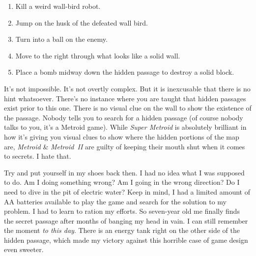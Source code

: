 \documentclass{book}
\let\oldcenter\center
\let\oldendcenter\endcenter
\renewenvironment{center}{\setlength\topsep{0pt}\oldcenter}{\oldendcenter}
\begin{document}
\begin{enumerate}
\item Kill a weird wall-bird robot.
\item Jump on the husk of the defeated wall bird.
\item Turn into a ball on the enemy.
\item Move to the right through what looks like a solid wall.
\item Place a bomb midway down the hidden passage to destroy a solid block.
\end{enumerate}\noindent

\begin{center}
\quad\vspace{4pt}
\quad\vspace{4pt}
\quad\vspace{4pt}
\quad\vspace{4pt}
\quad\vspace{4pt}
\quad\vspace{4pt}
\end{center}

It’s not impossible. It’s not overtly complex. But it is inexcusable that there is no hint whatsoever. There’s no instance where you are taught that hidden passages exist prior to this one. There is no visual clue on the wall to show the existence of the passage. Nobody tells you to search for a hidden passage (of course nobody talks to you, it’s a Metroid game). While \emph{Super Metroid} is absolutely brilliant in how it’s giving you visual clues to show where the hidden portions of the map are, \emph{Metroid} \& \emph{Metroid~II} are guilty of keeping their mouth shut when it comes to secrets. I hate that.

Try and put yourself in my shoes back then. I had no idea what I was supposed to do. Am I doing something wrong? Am I going in the wrong direction? Do I need to dive in the pit of electric water? Keep in mind, I had a limited amount of AA batteries available to play the game and search for the solution to my problem. I had to learn to ration my efforts. So seven-year old me finally finds the secret passage after months of banging my head in vain. I can still remember the moment \emph{to this day}. There is an energy tank right on the other side of the hidden passage, which made my victory against this horrible case of game design even sweeter.
\end{document}
